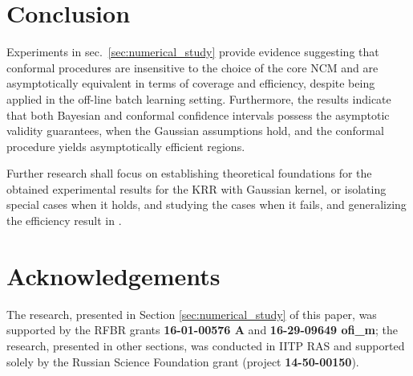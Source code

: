 \documentclass[conference]{IEEEtran}
\begin{document}

\section{Conclusion} %
\label{sec:conclusion}

Experiments in sec.~\ref{sec:numerical_study} provide evidence suggesting that
conformal procedures are insensitive to the choice of the core NCM and are asymptotically
equivalent in terms of coverage and efficiency, despite being applied in the off-line
batch learning setting. Furthermore, the results indicate that both Bayesian and
conformal confidence intervals possess the asymptotic validity guarantees, when
the Gaussian assumptions hold, and the conformal procedure yields asymptotically
efficient regions.

Further research shall focus on establishing theoretical foundations for the obtained
experimental results for the KRR with Gaussian kernel, or isolating special cases
when it holds, and studying the cases when it fails, and generalizing the efficiency
result in \cite{burnaevV14}.


\section*{Acknowledgements} %
\label{sec:acknowledgements}
\noindent The research, presented in Section \ref{sec:numerical_study} of this paper,
was supported by the RFBR grants \textbf{16-01-00576 A} and \textbf{16-29-09649 ofi\_m};
the research, presented in other sections, was conducted in IITP RAS and supported
solely by the Russian Science Foundation grant (project \textbf{14-50-00150}).




\end{document}
